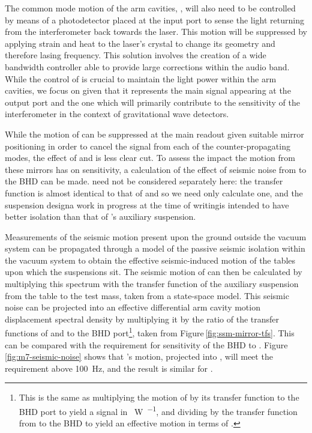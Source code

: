 The common mode motion of the arm cavities, \LPLUS{}, will also need to be controlled by means of a photodetector placed at the input port to sense the light returning from the interferometer back towards the laser. This motion will be suppressed by applying strain and heat to the laser's crystal to change its geometry and therefore lasing frequency. This solution involves the creation of a wide bandwidth controller able to provide large corrections within the audio band. While the control of \LPLUS{} is crucial to maintain the light power within the arm cavities, we focus on \LMINUS{} given that it represents the main signal appearing at the output port and the one which will primarily contribute to the sensitivity of the interferometer in the context of gravitational wave detectors.

While the motion of \MNINE{} can be suppressed at the main readout given suitable mirror positioning in order to cancel the signal from each of the counter-propagating modes, the effect of \MSIX{} and \MSEVEN{} is less clear cut. To assess the impact the motion from these mirrors has on \LMINUS{} sensitivity, a calculation of the effect of seismic noise from \MSEVEN{} to the \gls{BHD} can be made. \MSIX{} need not be considered separately here: the transfer function is almost identical to that of \MSEVEN{} and so we need only calculate one, and the suspension design\textemdash a work in progress at the time of writing\textemdash is intended to have better isolation than that of \MSEVEN{}'s auxiliary suspension.

Measurements of the seismic motion present upon the ground outside the vacuum system can be propagated through a model of the passive seismic isolation within the vacuum system to obtain the effective seismic-induced motion of the tables upon which the suspensions sit. The seismic motion of \MSEVEN{} can then be calculated by multiplying this spectrum with the transfer function of the auxiliary suspension from the table to the test mass, taken from a state-space model. This seismic noise can be projected into an effective differential arm cavity motion displacement spectral density by multiplying it by the ratio of the transfer functions of \MSEVEN{} and \LMINUS{} to the \gls{BHD} port\footnote{This is the same as multiplying the motion of \MSEVEN{} by its transfer function to the \gls{BHD} port to yield a signal in \SI{}{\watt\per\sqrthz}, and dividing by the transfer function from \LMINUS{} to the \gls{BHD} to yield an effective motion in terms of \LMINUS{}.}, taken from Figure\,\ref{fig:ssm-mirror-tfs}. This can be compared with the requirement for sensitivity of the \gls{BHD} to \LMINUS{}. Figure\,\ref{fig:m7-seismic-noise} shows that \MSEVEN{}'s motion, projected into \LMINUS{}, will meet the requirement above \SI{100}{\hertz}, and the result is similar for \MSIX{}.

